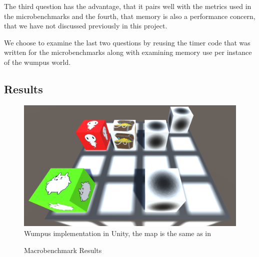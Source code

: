 The third question has the advantage, that it pairs well with the metrics used in the microbenchmarks and the fourth, that memory is also a performance concern, that we have not discussed previously in this project.

We choose to examine the last two questions by reusing the timer code that was written for the microbenchmarks along with examining memory use per instance of the wumpus world.

\subsection{Results}
\begin{figure}
    \centering
    \includegraphics[width=\textwidth]{images/Wumpus_Unity.png}
    \caption{Wumpus implementation in Unity, the map is the same as in }
    \label{fig:wumpus:world:unity}
\end{figure}

\begin{figure}[H]
    \caption{Macrobenchmark Results}
    \label{fig:macro-results}
\end{figure}